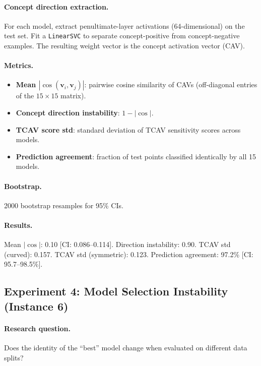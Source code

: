 \documentclass[11pt,a4paper]{article}
\begin{document}
\paragraph{Concept direction extraction.}
For each model, extract penultimate-layer activations (64-dimensional) on
the test set.  Fit a \texttt{LinearSVC} to separate concept-positive from
concept-negative examples.  The resulting weight vector is the concept
activation vector (CAV).

\paragraph{Metrics.}
\begin{itemize}[nosep]
  \item \textbf{Mean $|\cos(\mathbf{v}_i, \mathbf{v}_j)|$}: pairwise cosine
    similarity of CAVs (off-diagonal entries of the $15 \times 15$ matrix).
  \item \textbf{Concept direction instability}: $1 - |\cos|$.
  \item \textbf{TCAV score std}: standard deviation of TCAV sensitivity scores
    across models.
  \item \textbf{Prediction agreement}: fraction of test points classified
    identically by all 15 models.
\end{itemize}

\paragraph{Bootstrap.}
2000 bootstrap resamples for 95\% CIs.

\paragraph{Results.}
Mean $|\cos|$: 0.10 [CI: 0.086--0.114].  Direction instability: 0.90.
TCAV std (curved): 0.157.  TCAV std (symmetric): 0.123.  Prediction
agreement: 97.2\% [CI: 95.7--98.5\%].

\subsection{Experiment 4: Model Selection Instability (Instance 6)}
\label{app:exp-model-selection}

\paragraph{Research question.}
Does the identity of the ``best'' model change when evaluated on different
data splits?
\end{document}
